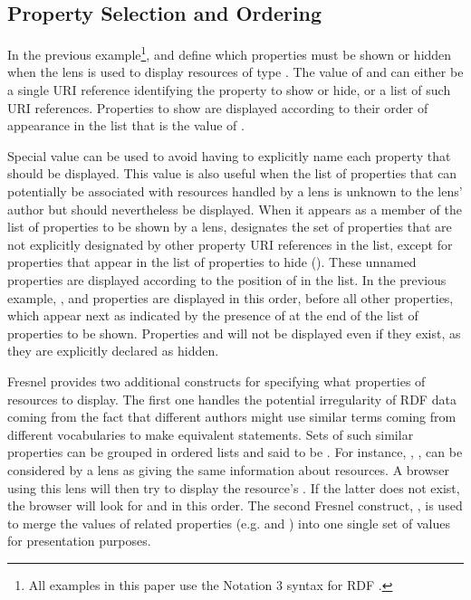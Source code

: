 \subsection{Property Selection and Ordering}

In the previous example\footnote{All examples in this paper use the Notation 3 syntax for RDF \cite{N3}.},  and  define which properties must be shown or hidden when the lens is used to display resources of type . The value of  and  can either be a single URI reference identifying the property to show or hide, or a list of such URI references. Properties to show are displayed according to their order of appearance in the list that is the value of .

Special value  can be used to avoid having to explicitly name each property that should be displayed. This value is also useful when the list of properties that can potentially be associated with resources handled by a lens is unknown to the lens' author but should nevertheless be displayed. When it appears as a member of the list of properties to be shown by a lens,  designates the set of properties that are not explicitly designated by other property URI references in the list, except for properties that appear in the list of properties to hide (). These unnamed properties are displayed according to the position of  in the list. In the previous example, ,  and  properties are displayed in this order, before all other properties, which appear next as indicated by the presence of  at the end of the list of properties to be shown. Properties  and  will not be displayed even if they exist, as they are explicitly declared as hidden.

Fresnel provides two additional constructs for specifying what properties of resources to display. The first one handles the potential irregularity of RDF data coming from the fact that different authors might use similar terms coming from different vocabularies to make equivalent statements. Sets of such similar properties can be grouped in ordered lists and said to be . For instance, , ,  can be considered by a lens as giving the same information about resources. A browser using this lens will then try to display the resource's . If the latter does not exist, the browser will look for  and  in this order. The second Fresnel construct, , is used to merge the values of related properties (e.g.  and ) into one single set of values for presentation purposes.

